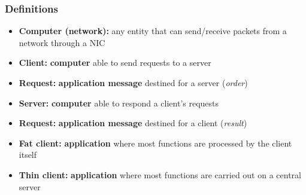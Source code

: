   \begin{frame}
    \frametitle{Definitions}
      \begin{itemize}
        \item \textbf{Computer (network):} any entity that can send/receive packets from a network through a NIC\pause
        \item \textbf{Client:} \textbf{computer} able to send requests to a server\pause
        \item \textbf{Request:} \textbf{application message} destined for a server (\emph{order})\pause
        \item \textbf{Server:} \textbf{computer} able to respond a client's requests\pause
        \item \textbf{Request:} \textbf{application message} destined for a client (\emph{result})\pause
        \item \textbf{Fat client:} \textbf{application} where most functions are processed by the client itself\pause
        \item \textbf{Thin client:} \textbf{application} where most functions are carried out on a central server
      \end{itemize}
  \end{frame}

